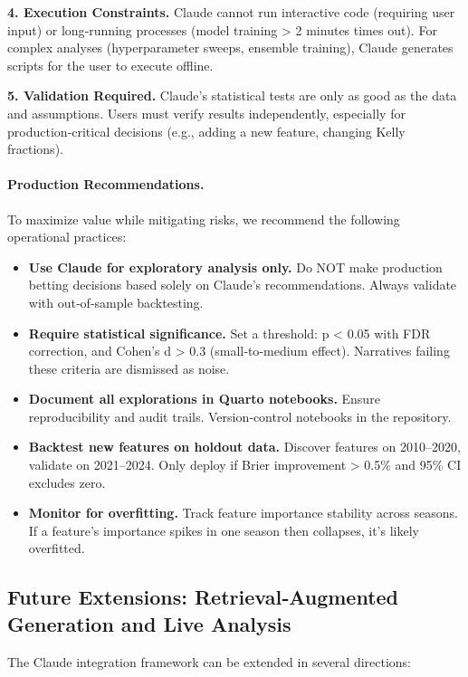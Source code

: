 \textbf{4. Execution Constraints.} Claude cannot run interactive code (requiring user input) or long‑running processes (model training > 2 minutes times out). For complex analyses (hyperparameter sweeps, ensemble training), Claude generates scripts for the user to execute offline.

\textbf{5. Validation Required.} Claude's statistical tests are only as good as the data and assumptions. Users must verify results independently, especially for production‑critical decisions (e.g., adding a new feature, changing Kelly fractions).

\paragraph{Production Recommendations.}
To maximize value while mitigating risks, we recommend the following operational practices:

\begin{itemize}
\item \textbf{Use Claude for exploratory analysis only.} Do NOT make production betting decisions based solely on Claude's recommendations. Always validate with out‑of‑sample backtesting.
\item \textbf{Require statistical significance.} Set a threshold: p < 0.05 with FDR correction, and Cohen's d > 0.3 (small‑to‑medium effect). Narratives failing these criteria are dismissed as noise.
\item \textbf{Document all explorations in Quarto notebooks.} Ensure reproducibility and audit trails. Version‑control notebooks in the repository.
\item \textbf{Backtest new features on holdout data.} Discover features on 2010--2020, validate on 2021--2024. Only deploy if Brier improvement > 0.5\% and 95\% CI excludes zero.
\item \textbf{Monitor for overfitting.} Track feature importance stability across seasons. If a feature's importance spikes in one season then collapses, it's likely overfitted.
\end{itemize}

\subsection{Future Extensions: Retrieval‑Augmented Generation and Live Analysis}
\label{subsec:future_extensions}

The Claude integration framework can be extended in several directions:

